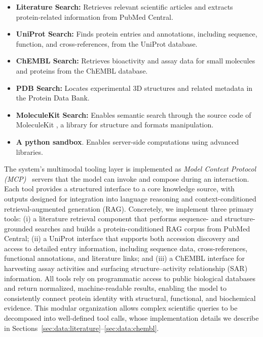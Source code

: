 \documentclass{article}
\begin{document}
\begin{itemize}[leftmargin=1em]
\item \textbf{Literature Search:} Retrieves relevant scientific articles and extracts protein-related information from PubMed Central.
\item \textbf{UniProt Search:} Finds protein entries and annotations, including sequence, function, and cross-references, from the UniProt database.
\item \textbf{ChEMBL Search:} Retrieves bioactivity and assay data for small molecules and proteins from the ChEMBL database.
\item \textbf{PDB Search:} Locates experimental 3D structures and related metadata in the Protein Data Bank.
\item \textbf{MoleculeKit Search:} Enables semantic search through the source code of MoleculeKit \citep{Doerr2016}, a library for structure and formats manipulation.
\item \textbf{A python sandbox}. Enables server-side computations using advanced libraries.
\end{itemize}


The system’s multimodal tooling layer is implemented as \emph{Model Context Protocol (MCP)}~\citep{anthropic_introducing_2024} servers that the model can invoke and compose during an interaction. Each tool provides a structured interface to a core knowledge source, with outputs designed for integration into language reasoning and context-conditioned retrieval-augmented generation (RAG). Concretely, we implement three primary tools: (i) a literature retrieval component that performs sequence- and structure-grounded searches and builds a protein-conditioned RAG corpus from PubMed Central; (ii) a UniProt interface that supports both accession discovery and access to detailed entry information, including sequence data, cross-references, functional annotations, and literature links; and (iii) a ChEMBL interface for harvesting assay activities and surfacing structure–activity relationship (SAR) information. All tools rely on programmatic access to public biological databases and return normalized, machine-readable results, enabling the model to consistently connect protein identity with structural, functional, and biochemical evidence. This modular organization allows complex scientific queries to be decomposed into well-defined tool calls, whose implementation details we describe in Sections~\ref{sec:data:literature}--\ref{sec:data:chembl}.
\end{document}
